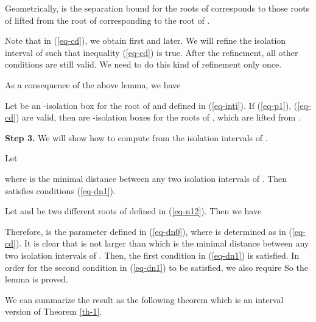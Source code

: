 \documentclass[amsthm]{JSC_LaTex_2007_Mar_12/elsart}
\def\bref#1{(\ref{#1})}
\begin{document}
Geometrically,  is the separation bound for the roots of
 corresponds to those roots of  lifted from
the root of  corresponding to the root  of
.

\begin{rem}\label{rem-2} Note that in \bref{eq-cd}, we obtain
 first and
 later. We will refine the
isolation interval  of  such that inequality
\bref{eq-cd} is true. After the refinement, all other conditions are
still valid. We need to do this kind of refinement only once.
\end{rem}

As a consequence of the above lemma, we have
\begin{cor}\label{cor-b2}
Let  be an -isolation box for the root 
of  and  defined in \bref{eq-inti}. If
\bref{eq-p1}, \bref{eq-cd} are valid, then  are -isolation boxes for the roots
 of , which are lifted from .
\end{cor}


{\bf Step 3.} We will show how to compute  from the
isolation intervals of .

\begin{lem}\label{lem-di}
Let

where  is the minimal distance between any two isolation
intervals of . Then  satisfies conditions
\bref{eq-dn1}.
\end{lem}
\begin{pf}
Let  and  be two different roots of
 defined in \bref{eq-n12}. Then we have

Therefore,   is the parameter defined in
\bref{eq-dn0}, where  is determined as in \bref{eq-cd}. It
is clear that  is not larger than  which is the
minimal distance between any two isolation intervals of
. Then, the first condition in \bref{eq-dn1} is
satisfied.
In order for the second condition in \bref{eq-dn1} to be satisfied,
we also require  So the lemma is
proved.
\end{pf}




We can summarize the result as the following theorem which is an
interval version of Theorem \ref{th-1}.
\end{document}
